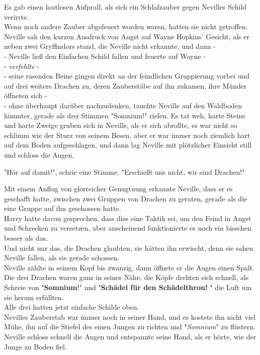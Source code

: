 {Es gab einen lautlosen Aufprall, als sich ein Schlafzauber gegen Nevilles Schild verirrte.\\ Wenn noch andere Zauber abgefeuert worden waren, hatten sie nicht getroffen. Neville sah den kurzen Ausdruck von Angst auf Wayne Hopkins' Gesicht, als er neben zwei Gryffindors stand, die Neville nicht erkannte, und dann -\\ - Neville ließ den Einfachen Schild fallen und feuerte auf Wayne -\\ - \emph{verfehlte} -\\ - seine rasenden Beine gingen direkt an der feindlichen Gruppierung vorbei und auf drei weitere Drachen zu, deren Zauberstäbe auf ihn zukamen, ihre Münder öffneten sich -\\ - ohne überhaupt darüber nachzudenken, tauchte Neville auf den Waldboden hinunter, gerade als drei Stimmen "Somnium!" riefen. Es tat weh, harte Steine und harte Zweige gruben sich in Neville, als er sich abrollte, es war nicht so schlimm wie der Sturz von seinem Besen, aber er war immer noch ziemlich hart auf dem Boden aufgeschlagen, und dann lag Neville mit plötzlicher Einsicht still und schloss die Augen.

"Hör auf damit!", schrie eine Stimme. "Erschießt uns nicht, wir sind Drachen!"

Mit einem Anflug von glorreicher Genugtuung erkannte Neville, dass er es geschafft hatte, zwischen zwei Gruppen von Drachen zu geraten, gerade als die eine Gruppe auf ihn geschossen hatte.\\ Harry hatte davon gesprochen, dass dies eine Taktik sei, um den Feind in Angst und Schrecken zu versetzen, aber anscheinend funktionierte es noch ein bisschen besser als das.\\ Und nicht nur das, die Drachen glaubten, sie hätten ihn erwischt, denn sie sahen Neville fallen, als sie gerade schossen.\\ Neville zählte in seinem Kopf bis zwanzig, dann öffnete er die Augen einen Spalt. Die drei Drachen waren ganz in seiner Nähe, die Köpfe drehten sich schnell, als Schreie von "\textbf{Somnium}!" und "\textbf{Schädel für den Schädelthron!} " die Luft um sie herum erfüllten.\\ Alle drei hatten jetzt einfache Schilde oben.\\ Nevilles Zauberstab war immer noch in seiner Hand, und es kostete ihn nicht viel Mühe, ihn auf die Stiefel des einen Jungen zu richten und "\emph{Somnium}" zu flüstern.\\ Neville schloss schnell die Augen und entspannte seine Hand, als er hörte, wie der Junge zu Boden fiel.

}
